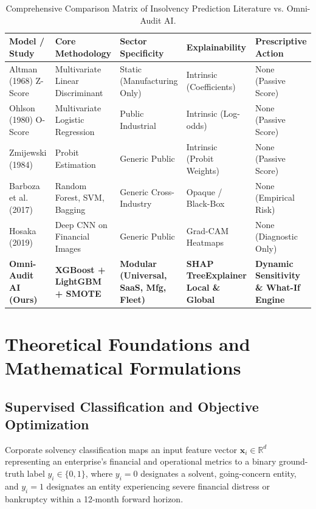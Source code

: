 \documentclass[11pt, a4paper]{article}
\begin{document}
\begin{table}[htbp]
\centering
\small
\begin{tabularx}{\textwidth}{lXXXX}
\toprule
\textbf{Model / Study} & \textbf{Core Methodology} & \textbf{Sector Specificity} & \textbf{Explainability} & \textbf{Prescriptive Action} \\
\midrule
Altman (1968) Z-Score & Multivariate Linear Discriminant & Static (Manufacturing Only) & Intrinsic (Coefficients) & None (Passive Score) \\
Ohlson (1980) O-Score & Multivariate Logistic Regression & Public Industrial & Intrinsic (Log-odds) & None (Passive Score) \\
Zmijewski (1984) & Probit Estimation & Generic Public & Intrinsic (Probit Weights) & None (Passive Score) \\
Barboza et al. (2017) & Random Forest, SVM, Bagging & Generic Cross-Industry & Opaque / Black-Box & None (Empirical Risk) \\
Hosaka (2019) & Deep CNN on Financial Images & Generic Public & Grad-CAM Heatmaps & None (Diagnostic Only) \\
\midrule
\textbf{Omni-Audit AI (Ours)} & \textbf{XGBoost + LightGBM + SMOTE} & \textbf{Modular (Universal, SaaS, Mfg, Fleet)} & \textbf{SHAP TreeExplainer Local \& Global} & \textbf{Dynamic Sensitivity \& What-If Engine} \\
\bottomrule
\end{tabularx}
\caption{Comprehensive Comparison Matrix of Insolvency Prediction Literature vs. Omni-Audit AI.}
\label{tab:lit_review}
\end{table}

\clearpage

\section{Theoretical Foundations and Mathematical Formulations}

\subsection{Supervised Classification and Objective Optimization}
Corporate solvency classification maps an input feature vector $\mathbf{x}_i \in \mathbb{R}^d$ representing an enterprise's financial and operational metrics to a binary ground-truth label $y_i \in \{0, 1\}$, where $y_i = 0$ designates a solvent, going-concern entity, and $y_i = 1$ designates an entity experiencing severe financial distress or bankruptcy within a 12-month forward horizon.
\end{document}
